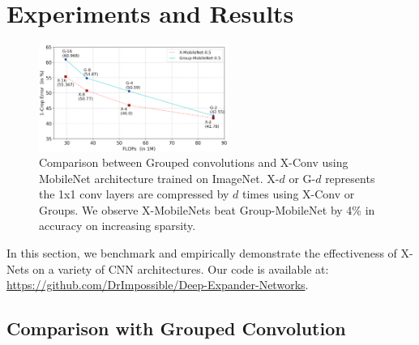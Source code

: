 \section{Experiments and Results}\label{sec:experiments}
\begin{figure}
\centering
\includegraphics[width=0.55\textwidth]{figures/mobilenet.png}
\caption{Comparison between Grouped convolutions and X-Conv using MobileNet architecture trained on ImageNet. X-$d$ or G-$d$ represents the 1x1 conv layers are compressed by $d$ times using X-Conv or Groups. We observe X-MobileNets beat Group-MobileNet by 4\% in accuracy on increasing sparsity.}
\label{fig:mobilenet}
\end{figure}
\noindent In this section, we benchmark and empirically demonstrate the effectiveness of X-Nets on a variety of CNN architectures. Our code is available at: \url{https://github.com/DrImpossible/Deep-Expander-Networks}. 
\subsection{Comparison with Grouped Convolution}
\label{sec:group}


